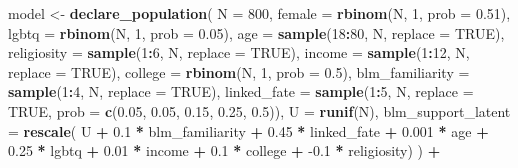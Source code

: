 \documentclass[
]{article}
\newenvironment{Shaded}{\begin{snugshade}}{\end{snugshade}}
\newcommand{\DataTypeTok}[1]{\textcolor[rgb]{0.13,0.29,0.53}{#1}}
\newcommand{\DecValTok}[1]{\textcolor[rgb]{0.00,0.00,0.81}{#1}}
\newcommand{\FloatTok}[1]{\textcolor[rgb]{0.00,0.00,0.81}{#1}}
\newcommand{\KeywordTok}[1]{\textcolor[rgb]{0.13,0.29,0.53}{\textbf{#1}}}
\newcommand{\NormalTok}[1]{#1}
\newcommand{\OperatorTok}[1]{\textcolor[rgb]{0.81,0.36,0.00}{\textbf{#1}}}
\newcommand{\OtherTok}[1]{\textcolor[rgb]{0.56,0.35,0.01}{#1}}
\newcommand{\StringTok}[1]{\textcolor[rgb]{0.31,0.60,0.02}{#1}}
\begin{document}
\begin{Shaded}
\begin{Highlighting}[]
\NormalTok{model <-}\StringTok{ }
\StringTok{  }\KeywordTok{declare_population}\NormalTok{(}
    \DataTypeTok{N =} \DecValTok{800}\NormalTok{,}
    \DataTypeTok{female =} \KeywordTok{rbinom}\NormalTok{(N, }\DecValTok{1}\NormalTok{, }\DataTypeTok{prob =} \FloatTok{0.51}\NormalTok{),}
    \DataTypeTok{lgbtq =} \KeywordTok{rbinom}\NormalTok{(N, }\DecValTok{1}\NormalTok{, }\DataTypeTok{prob =} \FloatTok{0.05}\NormalTok{),}
    \DataTypeTok{age =} \KeywordTok{sample}\NormalTok{(}\DecValTok{18}\OperatorTok{:}\DecValTok{80}\NormalTok{, N, }\DataTypeTok{replace =} \OtherTok{TRUE}\NormalTok{),}
    \DataTypeTok{religiosity =} \KeywordTok{sample}\NormalTok{(}\DecValTok{1}\OperatorTok{:}\DecValTok{6}\NormalTok{, N, }\DataTypeTok{replace =} \OtherTok{TRUE}\NormalTok{),}
    \DataTypeTok{income =} \KeywordTok{sample}\NormalTok{(}\DecValTok{1}\OperatorTok{:}\DecValTok{12}\NormalTok{, N, }\DataTypeTok{replace =} \OtherTok{TRUE}\NormalTok{),}
    \DataTypeTok{college =} \KeywordTok{rbinom}\NormalTok{(N, }\DecValTok{1}\NormalTok{, }\DataTypeTok{prob =} \FloatTok{0.5}\NormalTok{),}
    \DataTypeTok{blm_familiarity =} \KeywordTok{sample}\NormalTok{(}\DecValTok{1}\OperatorTok{:}\DecValTok{4}\NormalTok{, N, }\DataTypeTok{replace =} \OtherTok{TRUE}\NormalTok{),}
    \DataTypeTok{linked_fate =} \KeywordTok{sample}\NormalTok{(}\DecValTok{1}\OperatorTok{:}\DecValTok{5}\NormalTok{, N, }\DataTypeTok{replace =} \OtherTok{TRUE}\NormalTok{, }\DataTypeTok{prob =} \KeywordTok{c}\NormalTok{(}\FloatTok{0.05}\NormalTok{, }\FloatTok{0.05}\NormalTok{, }\FloatTok{0.15}\NormalTok{, }\FloatTok{0.25}\NormalTok{, }\FloatTok{0.5}\NormalTok{)),}
    \DataTypeTok{U =} \KeywordTok{runif}\NormalTok{(N),}
    \DataTypeTok{blm_support_latent =} \KeywordTok{rescale}\NormalTok{(}
\NormalTok{      U }\OperatorTok{+}\StringTok{ }\FloatTok{0.1} \OperatorTok{*}\StringTok{ }\NormalTok{blm_familiarity }\OperatorTok{+}\StringTok{ }\FloatTok{0.45} \OperatorTok{*}\StringTok{ }\NormalTok{linked_fate }\OperatorTok{+}\StringTok{ }\FloatTok{0.001} \OperatorTok{*}\StringTok{ }\NormalTok{age }\OperatorTok{+}\StringTok{ }
\StringTok{        }\FloatTok{0.25} \OperatorTok{*}\StringTok{ }\NormalTok{lgbtq }\OperatorTok{+}\StringTok{ }\FloatTok{0.01} \OperatorTok{*}\StringTok{ }\NormalTok{income }\OperatorTok{+}\StringTok{ }\FloatTok{0.1} \OperatorTok{*}\StringTok{ }\NormalTok{college }\OperatorTok{+}\StringTok{ }\FloatTok{-0.1} \OperatorTok{*}\StringTok{ }\NormalTok{religiosity)}
\NormalTok{  ) }\OperatorTok{+}\StringTok{ }

\end{Highlighting}
\end{Shaded}
\end{document}
